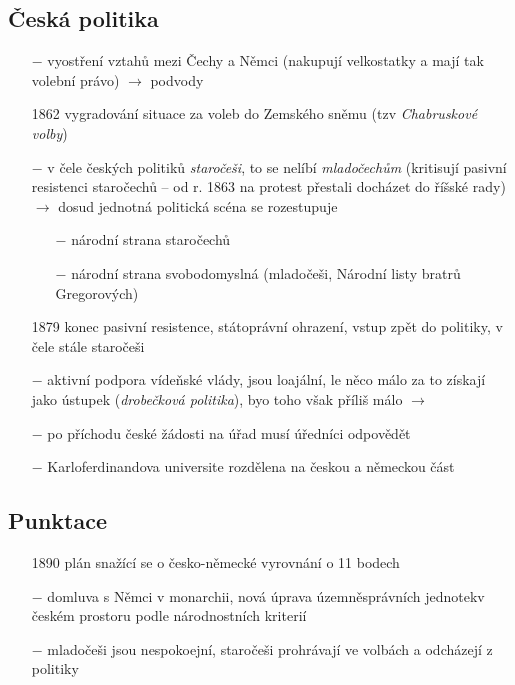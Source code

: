 \documentclass{article}
\begin{document}
\subsection*{Česká politika}
\begin{itemize}
    \vspace{-0.5em}
    \setlength\itemsep{0.15em}
    \item[$-$] vyostření vztahů mezi Čechy a Němci (nakupují velkostatky a mají tak volební právo) $\rightarrow$ podvody
    \item[1862] vygradování situace za voleb do Zemského sněmu (tzv \textit{Chabruskové volby})
    \item[$-$] v čele českých politiků \textit{staročeši}, to se nelíbí \textit{mladočechům} (kritisují pasivní resistenci staročechů -- od r. 1863 na protest přestali docházet do říšské rady) $\rightarrow$ dosud jednotná politická scéna se rozestupuje
    \begin{itemize}
        \vspace{-0.5em}
        \setlength\itemsep{0.15em}
        \item[$-$] národní strana staročechů
        \item[$-$] národní strana svobodomyslná (mladočeši, Národní listy bratrů Gregorových)
    \end{itemize}
    \item[1879] konec pasivní resistence, státoprávní ohrazení, vstup zpět do politiky, v čele stále staročeši
    \item[$-$] aktivní podpora vídeňské vlády, jsou loajální, le něco málo za to získají jako ústupek (\textit{drobečková politika}), byo toho však příliš málo $\rightarrow$
    \item[$-$] po příchodu české žádosti na úřad musí úředníci odpovědět
    \item[$-$] Karloferdinandova universite rozdělena na českou a německou část
\end{itemize}

\subsection*{Punktace}
\begin{itemize}
    \vspace{-0.5em}
    \setlength\itemsep{0.15em}
    \item[1890] plán snažící se o česko-německé vyrovnání o 11 bodech
    \item[$-$] domluva s Němci v monarchii, nová úprava územněsprávních jednotekv českém prostoru podle národnostních kriterií
    \item[$-$] mladočeši jsou nespokoejní, staročeši prohrávají ve volbách a odcházejí z politiky
\end{itemize}
\end{document}
